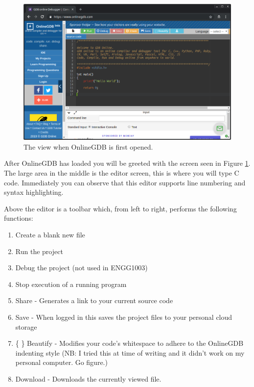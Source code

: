 \documentclass{lab}
\begin{document}
\begin{figure}[H]
\begin{center}
\includegraphics[width=\textwidth]{Wk1Images/onlinegdb.png}
\end{center}
\caption{The view when OnlineGDB is first opened.}\label{fig:onlinegdb}
\end{figure}

After OnlineGDB has loaded you will be greeted with the screen seen in Figure \ref{fig:onlinegdb}. The large area in the middle is the editor screen, this is where you will type C code. Immediately you can observe that this editor supports line numbering and syntax highlighting.

Above the editor is a toolbar which, from left to right, performs the following functions:

\begin{enumerate}
\item Create a blank new file
\item Run the project
\item Debug the project (not used in ENGG1003)
\item Stop execution of a running program
\item Share - Generates a link to your current source code
\item Save - When logged in this saves the project files to your personal cloud storage
\item \{ \} Beautify - Modifies your code's whitespace to adhere to the OnlineGDB indenting style (NB: I tried this at time of writing and it didn't work on my personal computer. Go figure.)
\item Download - Downloads the currently viewed file.
\end{enumerate}
\end{document}
